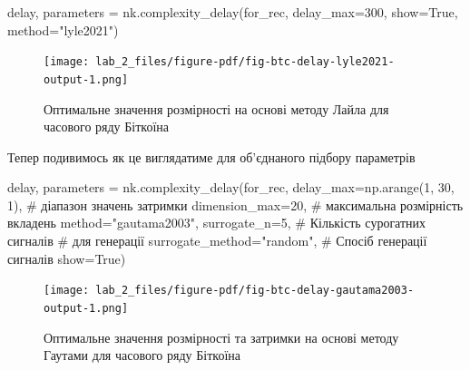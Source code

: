 \documentclass[
  letterpaper,
]{report}
\newenvironment{Shaded}{\begin{snugshade}}{\end{snugshade}}
\newcommand{\CommentTok}[1]{\textcolor[rgb]{0.37,0.37,0.37}{#1}}
\newcommand{\DecValTok}[1]{\textcolor[rgb]{0.68,0.00,0.00}{#1}}
\newcommand{\NormalTok}[1]{\textcolor[rgb]{0.00,0.23,0.31}{#1}}
\newcommand{\OperatorTok}[1]{\textcolor[rgb]{0.37,0.37,0.37}{#1}}
\newcommand{\StringTok}[1]{\textcolor[rgb]{0.13,0.47,0.30}{#1}}
\newcommand{\VariableTok}[1]{\textcolor[rgb]{0.07,0.07,0.07}{#1}}
\begin{document}
\begin{Shaded}
\begin{Highlighting}[]
\NormalTok{delay, parameters }\OperatorTok{=}\NormalTok{ nk.complexity\_delay(for\_rec, }
\NormalTok{                                        delay\_max}\OperatorTok{=}\DecValTok{300}\NormalTok{, show}\OperatorTok{=}\VariableTok{True}\NormalTok{,}
\NormalTok{                                        method}\OperatorTok{=}\StringTok{"lyle2021"}\NormalTok{)}
\end{Highlighting}
\end{Shaded}

\begin{figure}[H]

{\centering \texttt{[image: lab\_2\_files/figure-pdf/fig-btc-delay-lyle2021-output-1.png]}

}

\caption{\label{fig-btc-delay-lyle2021}Оптимальне значення розмірності
на основі методу Лайла для часового ряду Біткоїна}

\end{figure}

Тепер подивимось як це виглядатиме для об'єднаного підбору параметрів

\begin{Shaded}
\begin{Highlighting}[]
\NormalTok{delay, parameters }\OperatorTok{=}\NormalTok{ nk.complexity\_delay(for\_rec,}
\NormalTok{    delay\_max}\OperatorTok{=}\NormalTok{np.arange(}\DecValTok{1}\NormalTok{, }\DecValTok{30}\NormalTok{, }\DecValTok{1}\NormalTok{), }\CommentTok{\# діапазон значень затримки}
\NormalTok{    dimension\_max}\OperatorTok{=}\DecValTok{20}\NormalTok{,              }\CommentTok{\# максимальна розмірність вкладень}
\NormalTok{    method}\OperatorTok{=}\StringTok{"gautama2003"}\NormalTok{,}
\NormalTok{    surrogate\_n}\OperatorTok{=}\DecValTok{5}\NormalTok{,                 }\CommentTok{\# Кількість сурогатних сигналів }
                                   \CommentTok{\# для генерації}
\NormalTok{    surrogate\_method}\OperatorTok{=}\StringTok{"random"}\NormalTok{,     }\CommentTok{\# Спосіб генерації сигналів}
\NormalTok{    show}\OperatorTok{=}\VariableTok{True}\NormalTok{)}
 
\end{Highlighting}
\end{Shaded}

\begin{figure}[H]

{\centering \texttt{[image: lab\_2\_files/figure-pdf/fig-btc-delay-gautama2003-output-1.png]}

}

\caption{\label{fig-btc-delay-gautama2003}Оптимальне значення
розмірності та затримки на основі методу Гаутами для часового ряду
Біткоїна}

\end{figure}
\end{document}
